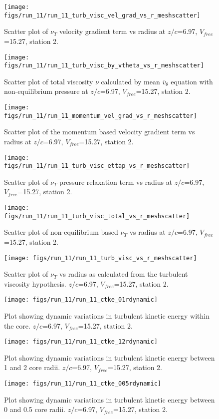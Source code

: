 \begin{figure}[H]
\centering
\texttt{[image: figs/run\_11/run\_11\_turb\_visc\_vel\_grad\_vs\_r\_meshscatter]}
\caption{Scatter plot of $\nu_T$ velocity gradient term vs radius at $z/c$=6.97, $V_{free}$=15.27, station 2.}
\end{figure}


\begin{figure}[H]
\centering
\texttt{[image: figs/run\_11/run\_11\_turb\_visc\_by\_vtheta\_vs\_r\_meshscatter]}
\caption{Scatter plot of total viscosity $\nu$ calculated by mean $\bar{v}_{\theta}$ equation with non-equilibrium pressure at $z/c$=6.97, $V_{free}$=15.27, station 2.}
\end{figure}


\begin{figure}[H]
\centering
\texttt{[image: figs/run\_11/run\_11\_momentum\_vel\_grad\_vs\_r\_meshscatter]}
\caption{Scatter plot of the momentum based velocity gradient term vs radius at $z/c$=6.97, $V_{free}$=15.27, station 2.}
\end{figure}


\begin{figure}[H]
\centering
\texttt{[image: figs/run\_11/run\_11\_turb\_visc\_ettap\_vs\_r\_meshscatter]}
\caption{Scatter plot of $\nu_T$ pressure relaxation term vs radius at $z/c$=6.97, $V_{free}$=15.27, station 2.}
\end{figure}


\begin{figure}[H]
\centering
\texttt{[image: figs/run\_11/run\_11\_turb\_visc\_total\_vs\_r\_meshscatter]}
\caption{Scatter plot of non-equilibrium based $\nu_T$ vs radius at $z/c$=6.97, $V_{free}$=15.27, station 2.}
\end{figure}


\begin{figure}[H]
\centering
\texttt{[image: figs/run\_11/run\_11\_turb\_visc\_vs\_r\_meshscatter]}
\caption{Scatter plot of $\nu_T$ vs radius as calculated from the turbulent viscosity hypothesis. $z/c$=6.97, $V_{free}$=15.27, station 2.}
\end{figure}


\begin{figure}[H]
\centering
\texttt{[image: figs/run\_11/run\_11\_ctke\_01rdynamic]}
\caption{Plot showing dynamic variations in turbulent kinetic energy within the core. $z/c$=6.97, $V_{free}$=15.27, station 2.}
\end{figure}


\begin{figure}[H]
\centering
\texttt{[image: figs/run\_11/run\_11\_ctke\_12rdynamic]}
\caption{Plot showing dynamic variations in turbulent kinetic energy between 1 and 2 core radii. $z/c$=6.97, $V_{free}$=15.27, station 2.}
\end{figure}


\begin{figure}[H]
\centering
\texttt{[image: figs/run\_11/run\_11\_ctke\_005rdynamic]}
\caption{Plot showing dynamic variations in turbulent kinetic energy between 0 and 0.5 core radii. $z/c$=6.97, $V_{free}$=15.27, station 2.}
\end{figure}


